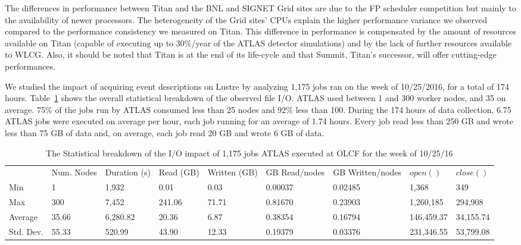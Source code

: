 

The differences in performance between Titan and the BNL and SIGNET Grid
sites are due to the FP scheduler competition but mainly to the availability
of newer processors. 
The heterogeneity of the Grid sites' CPUs explain the higher performance
variance we observed compared to the performance consistency we measured on
Titan. This difference in performance is compensated by the amount of
resources available on Titan (capable of executing up to 30\%/year of the
ATLAS detector simulations) and by the lack of further resources available to
WLCG\@. Also, it should be noted that Titan is at the end of its life-cycle
and that Summit, Titan's successor, will offer cutting-edge performances.

We studied the impact of acquiring event descriptions on Lustre by analyzing
1,175 jobs ran on the week of 10/25/2016, for a total of 174 hours.
Table~\ref{panda-olcf-stats} shows the overall statistical breakdown of the
observed file I/O. ATLAS used between 1 and 300 worker nodes, and 35 on
average. 75\% of the jobs run by ATLAS consumed less than 25 nodes and 92\%
less than 100. During the 174 hours of data collection, 6.75 ATLAS jobs were
executed on average per hour, each job running for an average of 1.74 hours.
Every job read less than 250 GB and wrote less than 75 GB of data and, on
average, each job read 20 GB and wrote 6 GB of data.

\begin{table}[t]
\centering
\begin{tabular}{lllllllll} & Num. Nodes & Duration (s) & Read (GB) & Written
 (GB) & GB Read/nodes & GB Written/nodes & \(open()\) & \(close()\) \\ Min & 1 &
 1,932 & 0.01 & 0.03 & 0.00037 & 0.02485 & 1,368 & 349 \\ Max & 300 & 7,452 &
 241.06 & 71.71 & 0.81670 & 0.23903 & 1,260,185 & 294,908 \\ Average & 35.66
 & 6,280.82 & 20.36 & 6.87 & 0.38354 & 0.16794 & 146,459.37 & 34,155.74 \\
 Std. Dev. & 55.33 & 520.99 & 43.90 & 12.33 & 0.19379 & 0.03376 & 231,346.55
 & 53,799.08
\end{tabular}
\caption{The Statistical breakdown of the I/O impact of 1,175 jobs ATLAS
executed at OLCF for the week of 10/25/16}\label{panda-olcf-stats}
\end{table}

